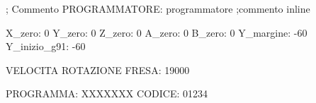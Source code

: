; Commento
PROGRAMMATORE: programmatore    ;commento inline

X_zero: 0
Y_zero: 0
Z_zero: 0
A_zero: 0
B_zero: 0
Y_margine: -60
Y_inizio_g91: -60


VELOCITA ROTAZIONE FRESA: 19000

PROGRAMMA: XXXXXXX
CODICE: 01234
